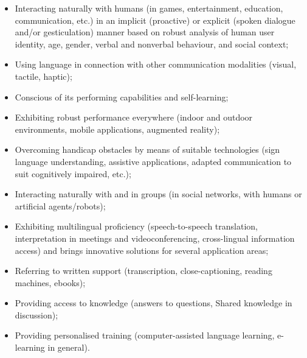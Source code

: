 \documentclass[10pt, plain]{../../metanetpaper}
\begin{document}
\begin{multicols}{2}
\begin{itemize}
\item Interacting naturally with humans (in games, entertainment, education, communication, etc.) in an implicit (proactive) or explicit (spoken dialogue and/or gesticulation) manner based on robust analysis of human user identity, age, gender, verbal and nonverbal behaviour, and social context;
\item Using language in connection with other communication modalities (visual, tactile, haptic);
\item Conscious of its performing capabilities and self-learning;
\item Exhibiting robust performance everywhere (indoor and outdoor environments, mobile applications, augmented reality);
\item Overcoming handicap obstacles by means of suitable technologies (sign language understanding, assistive applications, adapted communication to suit cognitively impaired, etc.);
\item Interacting naturally with and in groups (in social networks, with humans or artificial agents/robots);
\item Exhibiting multilingual proficiency (speech-to-speech translation, interpretation in meetings and videoconferencing, cross-lingual information access) and brings innovative solutions for several application areas;
\item Referring to written support (transcription, close-captioning, reading machines, ebooks);
\item Providing access to knowledge (answers to questions, Shared knowledge in discussion);
\item Providing personalised training (computer-assisted language learning, e-learning in general).
\end{itemize}


\end{multicols}
\end{document}
